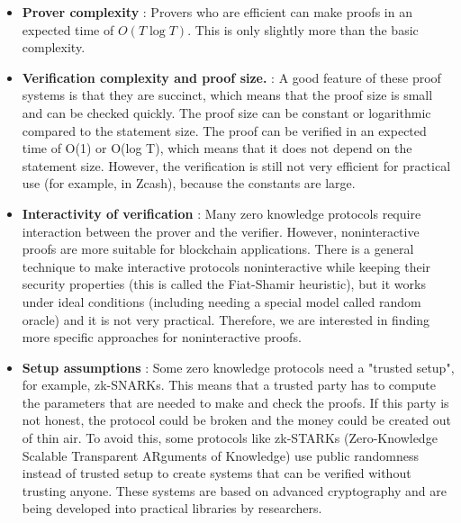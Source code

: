 \begin{itemize}
	\item \textbf{Prover complexity} : Provers who are efficient can make proofs in an expected time of $O(T \log T)$. This is only slightly more than the basic complexity.
	\item \textbf{Verification complexity and proof size.} : A good feature of these proof systems is that they are succinct, which means that the proof size is small and can be checked quickly. The proof size can be constant or logarithmic compared to the statement size. The proof can be verified in an expected time of O(1) or O(log T), which means that it does not depend on the statement size. However, the verification is still not very efficient for practical use (for example, in Zcash), because the constants are large.
	\item \textbf{Interactivity of verification} : Many zero knowledge protocols require interaction between the prover and the verifier. However, noninteractive proofs are more suitable for blockchain applications. There is a general technique to make interactive protocols noninteractive while keeping their security properties (this is called the Fiat-Shamir heuristic), but it works under ideal conditions (including needing a special model called random oracle) and it is not very practical. Therefore, we are interested in finding more specific approaches for noninteractive proofs.
	\item \textbf{Setup assumptions} : Some zero knowledge protocols need a "trusted setup", for example, zk-SNARKs. This means that a trusted party has to compute the parameters that are needed to make and check the proofs. If this party is not honest, the protocol could be broken and the money could be created out of thin air. To avoid this, some protocols like zk-STARKs (Zero-Knowledge Scalable Transparent ARguments of Knowledge) use public randomness instead of trusted setup to create systems that can be verified without trusting anyone. These systems are based on advanced cryptography and are being developed into practical libraries by researchers.
\end{itemize}

